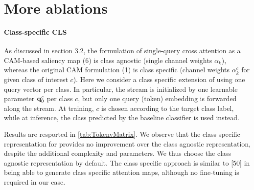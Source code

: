 

\section{More ablations}





\paragraph{Class-specific CLS}

As discussed in section 3.2, the formulation of single-query cross attention as a CAM-based saliency map (6) is class agnostic (single channel weights $\alpha_k$), whereas the original CAM formulation (1) is class specific (channel weights $\alpha_k^c$ for given class of interest $c$). 
Here we consider a class specific extension of \Ours using one query vector per class. 
In particular, the stream is initialized by one learnable parameter $\mathbf{q}_0^c$ per class $c$, but only one query (\cls token) embedding is forwarded along the stream. At training, $c$ is chosen according to the target class label, while at inference, the class predicted by the baseline classifier is used instead.


Results are resported in \autoref{tab:TokenvMatrix}. We observe that the class specific representation for \Ours provides no improvement over the class agnostic representation, despite the additional complexity and parameters. We thus choose the class agnostic representation by default. The class specific approach is similar to [50] in being able to generate class specific attention maps, although no fine-tuning is required in our case. 





